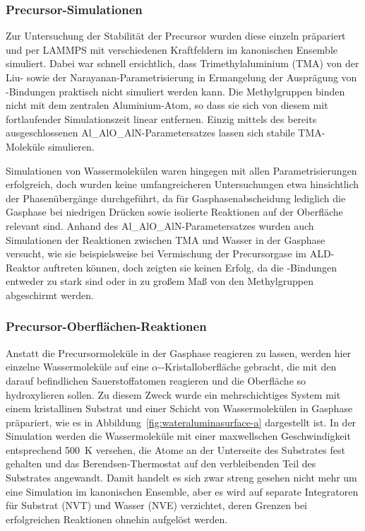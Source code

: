 \subsubsection{Precursor-Simulationen}

Zur Untersuchung der Stabilität der Precursor wurden diese einzeln präpariert und per LAMMPS mit verschiedenen Kraftfeldern im kanonischen Ensemble simuliert.
Dabei war schnell ersichtlich, dass Trimethylaluminium (TMA) von der Liu- sowie der Narayanan-Parametrisierung in Ermangelung der Ausprägung von -Bindungen praktisch nicht simuliert werden kann.
Die Methylgruppen binden nicht mit dem zentralen Aluminium-Atom, so dass sie sich von diesem mit fortlaufender Simulationszeit linear entfernen.
Einzig mittels des bereits ausgeschlossenen Al\_AlO\_AlN-Parametersatzes lassen sich stabile TMA-Moleküle simulieren.


Simulationen von Wassermolekülen waren hingegen mit allen Parametrisierungen erfolgreich, doch wurden keine umfangreicheren Untersuchungen etwa hinsichtlich der Phasenübergänge durchgeführt, da für Gasphasenabscheidung lediglich die Gasphase bei niedrigen Drücken sowie isolierte Reaktionen auf der Oberfläche relevant sind.
Anhand des Al\_AlO\_AlN-Parametersatzes wurden auch Simulationen der Reaktionen zwischen TMA und Wasser in der Gasphase versucht, wie sie beispielsweise bei Vermischung der Precursorgase im ALD-Reaktor auftreten können, doch zeigten sie keinen Erfolg, da die -Bindungen entweder zu stark sind oder in zu großem Maß von den Methylgruppen abgeschirmt werden.

\subsubsection{Precursor-Oberflächen-Reaktionen}

Anstatt die Precursormoleküle in der Gasphase reagieren zu lassen, werden hier einzelne Wassermoleküle auf eine $\alpha$--Kristalloberfläche gebracht, die mit den darauf befindlichen Sauerstoffatomen reagieren und die Oberfläche so hydroxylieren sollen\cite{shapalov_initio_2000}.
Zu diesem Zweck wurde ein mehrschichtiges System mit einem kristallinen Substrat und einer Schicht von Wassermolekülen in Gasphase präpariert, wie es in Abbildung~\ref{fig:wateraluminasurface-a} dargestellt ist.
In der Simulation werden die Wassermoleküle mit einer maxwellschen Geschwindigkeit entsprechend \SI{500}{\kelvin} versehen, die Atome an der Unterseite des Substrates fest gehalten und das Berendsen-Thermostat auf den verbleibenden Teil des Substrates angewandt.
Damit handelt es sich zwar streng gesehen nicht mehr um eine Simulation im kanonischen Ensemble, aber es wird auf separate Integratoren für Substrat (NVT) und Wasser (NVE) verzichtet, deren Grenzen bei erfolgreichen Reaktionen ohnehin aufgelöst werden.

